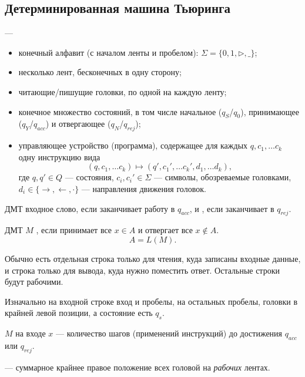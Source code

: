 \subsection{Детерминированная машина Тьюринга}
\begin{defn}
	 ---
	\begin{itemize}[noitemsep]
		\item конечный алфавит (с началом ленты и пробелом): $ \Sigma  = \{0, 1, \triangleright, \_\}$;
		\item несколько лент, бесконечных в одну сторону;
		\item читающие/пишущие головки, по одной на каждую ленту;
		\item конечное множество состояний, в том числе начальное ($ q_S$/$q_0$), принимающее ($ q_Y $/$ q_{acc}$) и отвергающее ($ q_N$/$ q_{rej}$);
		\item управляющее устройство (программа), содержащее для каждых $ q, c_1, \ldots c_k$ одну инструкцию вида
			\[
				(q, c_1, \ldots c_k) \mapsto (q', c_1', \ldots c_k', d_1, \ldots d_k)
			,\]
			где $ q, q' \in Q$ --- состояния, $ c_i, c_i' \in \Sigma $ --- символы, обозреваемые головками, $ d_i \in \{ \to , \leftarrow, \cdot  \}$ --- направления движения головок.
	\end{itemize}

	ДМТ  входное слово, если заканчивает работу в $ q_{acc}$, и , если заканчивает в $ q_{rej}$.

	ДМТ $ M$ , если принимает все $ x \in A$ и отвергает все $ x \not\in A$.
	\[
		A = L(M)
	.\]
\end{defn}
\begin{note}
	Обычно есть отдельная строка только для чтения, куда записаны входные данные, и строка только для вывода, куда нужно поместить ответ. Остальные строки будут рабочими.
\end{note}
\begin{note}
	Изначально на входной строке вход и пробелы, на остальных пробелы, головки в крайней левой позиции, а состояние есть $ q_s$.
\end{note}

\begin{defn}
	  $ M$ на входе $ x$ --- количество шагов (применений инструкций) до достижения $ q_{acc}$ или $ q_{rej}$.

	\noindent
	  --- суммарное крайнее правое положение всех головой на \textit{рабочих} лентах.
\end{defn}

